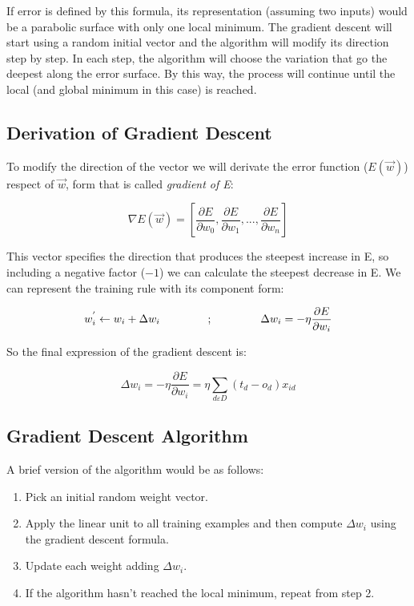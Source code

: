 	If error is defined by this formula, its representation (assuming two inputs) would be a parabolic surface with only one local minimum. The gradient descent will start using a random initial vector and the algorithm will modify its direction step by step. In each step, the algorithm will choose the variation that go the deepest along the error surface. By this way, the process will continue until the local (and global minimum in this case) is reached.

	\subsection{Derivation of Gradient Descent}
	To modify the direction of the vector we will derivate the error function ($E(\vec{w})$) respect of $\vec{w}$, form that is called \textit{gradient of E}:

	\begin{equation}
		\label{gradient_of_E}
		\nabla E(\vec{w})= [\frac{\partial{E}}{\partial{w_{0}}}, \frac{\partial{E}}{\partial{w_{1}}}, ..., \frac{\partial{E}}{\partial{w_{n}}}]
	\end{equation}

	This vector specifies the direction that produces the steepest increase in E, so including a negative factor ($-1$) we can calculate the steepest decrease in E. We can represent the training rule with its component form:

	\begin{equation}
		\label{training_rule_component_form}
		w_{i}^{'} \leftarrow w_{i} + \Delta w_{i} \hspace{1.5cm} ; \hspace{1.5cm} \Delta{w_{i}}=-\eta \frac{\partial{E}}{\partial{w_i}}
	\end{equation}

	So the final expression of the gradient descent is:

	\begin{equation}
		\label{gradient_descent_final_expr}
		\Delta w_i = -\eta \frac{\partial{E}}{\partial{w_i}} = \eta \sum_{d \varepsilon D} (t_d - o_d) x_{id}
	\end{equation}


	\subsection{Gradient Descent Algorithm}
	A brief version of the algorithm would be as follows:

	\begin{enumerate}

		\item Pick an initial random weight vector.
		\item Apply the linear unit to all training examples and then compute $\Delta w_i$  using the gradient descent formula.
		\item Update each weight adding $\Delta w_i$.
		\item If the algorithm hasn’t reached the local minimum, repeat from step 2.
	
	\end{enumerate}

